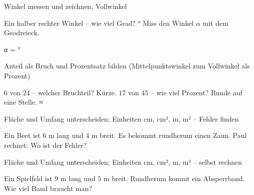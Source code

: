 \begin{aufgabe}{Winkel messen und zeichnen, Vollwinkel}
\begin{teile}
\teil Ein halber rechter Winkel – wie viel Grad? \leerfeld °
\teil Miss den Winkel $\alpha$ mit dem Geodreieck.

α = \leerfeld °
\end{teile}
\end{aufgabe}

\begin{aufgabe}{Anteil als Bruch und Prozentsatz bilden (Mittelpunktswinkel zum Vollwinkel als Prozent)}
\begin{teile}
\teil $6$ von $24$ – welcher Bruchteil? Kürze. \leerfeld
\teil $17$ von $45$ – wie viel Prozent? Runde auf eine Stelle. ≈ \leerfeld[\%]
\end{teile}
\end{aufgabe}

\begin{aufgabe}{Fläche und Umfang unterscheiden; Einheiten cm, cm², m, m² – Fehler finden}
\begin{teile}
\teil Ein Beet ist $6$ m lang und $4$ m breit. Es bekommt rundherum einen Zaun. Paul rechnet:  Wo ist der Fehler?
\end{teile}
\end{aufgabe}

\begin{aufgabe}{Fläche und Umfang unterscheiden; Einheiten cm, cm², m, m² – selbst rechnen}
\begin{teile}
\teil Ein Spielfeld ist $9$ m lang und $5$ m breit. Rundherum kommt ein Absperrband. Wie viel Band braucht man? \leerfeld[m]
\end{teile}
\end{aufgabe}
